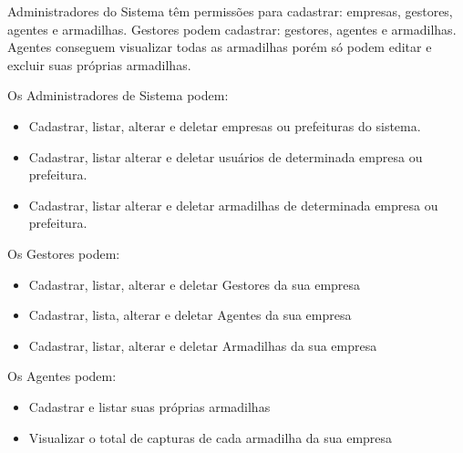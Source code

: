 	Administradores do Sistema têm permissões para cadastrar: empresas, gestores, agentes e armadilhas.
	Gestores podem cadastrar: gestores, agentes e armadilhas.
	Agentes conseguem visualizar todas as armadilhas porém só podem editar e excluir suas próprias armadilhas.
	
	Os Administradores de Sistema podem: 
	\begin{itemize}
		\item  Cadastrar, listar, alterar e deletar empresas ou prefeituras do sistema. 
		\item  Cadastrar, listar alterar e deletar usuários de determinada empresa ou prefeitura.
		\item  Cadastrar, listar alterar e deletar armadilhas de determinada empresa ou prefeitura.
	\end{itemize}
	
	Os Gestores podem:
	\begin{itemize}
		\item  Cadastrar, listar, alterar e deletar Gestores da sua empresa
		\item  Cadastrar, lista, alterar e deletar Agentes da sua empresa
		\item  Cadastrar, listar, alterar e deletar Armadilhas da sua empresa
	\end{itemize}
	
	Os Agentes podem:
	\begin{itemize}
		\item Cadastrar e listar suas próprias armadilhas
		\item Visualizar o total de capturas de cada armadilha da sua empresa
	\end{itemize}
	
